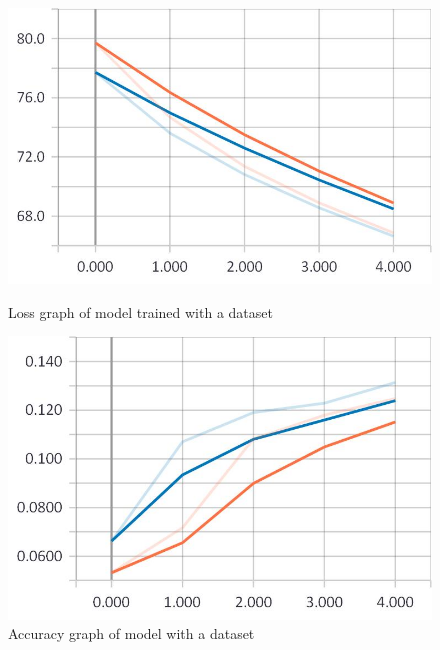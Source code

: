 \begin{figure}
\centering
\begin{minipage}{.5\textwidth}
	\centering
	\includegraphics[width=1\linewidth]{Illustrations/losss1.jpg}
	\caption{Loss graph of model trained with a dataset}
	\label{fig:loss1}
\end{minipage}%
\begin{minipage}{.5\textwidth}
	\centering
	\includegraphics[width=1\linewidth]{Illustrations/accuracy1.jpg}
	\caption{Accuracy graph of model with a dataset}
	\label{fig:accuracy1}
\end{minipage}
\end{figure}

